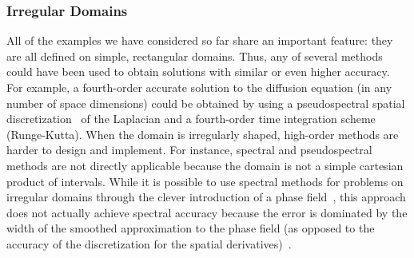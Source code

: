 \documentclass[oneeqnum,onefignum,onetabnum,onethmnum]{siamltex}
\begin{document}
\subsubsection{Irregular Domains}
All of the examples we have considered so far share an important feature: they 
are all defined on simple, rectangular domains.  Thus, any of several methods 
could have been used to obtain solutions with similar or even higher accuracy.
For example, a fourth-order accurate solution to the diffusion equation
(in any number of space dimensions) could be obtained by using a 
pseudospectral spatial discretization~\cite{trefethen_spectral_book, 
boyd_spectral_book} of the Laplacian and a fourth-order time integration scheme 
(\eg Runge-Kutta).  When the domain is irregularly shaped, high-order methods 
are harder to design and implement.  For instance, spectral and pseudospectral 
methods are not directly applicable because the domain is not a simple 
cartesian product of intervals.  While it is possible to use spectral methods
for problems on irregular domains through the clever introduction of a phase 
field~\cite{bueno_orovio_2006, feng_2006}, this approach does not 
actually achieve spectral accuracy because the error is dominated by the 
width of the smoothed approximation to the phase field (as opposed to the 
accuracy of the discretization for the spatial 
derivatives)~\cite{bueno_orovio_2006}.
\end{document}
